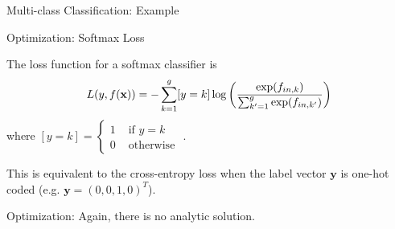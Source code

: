 \documentclass[11pt,compress,t,notes=noshow, xcolor=table]{beamer}
\begin{document}
\begin{frame} {Multi-class Classification: Example}
\begin{figure}
\end{figure}
\end{frame}

\begin{framei} {Optimization: Softmax Loss}
\vfill
\item The loss function for a softmax classifier is
$$L(y, f(\mathbf{x})) = - \sum_{k = 1}^g [y = k] \log \left( \frac{\exp(f_{in,k})}{\sum_{k'=1}^g\exp(f_{in,k'})}\right)$$
where $[y = k] = \begin{cases} 1 & \text{ if } y = k \\
0 & \text{ otherwise }
\end{cases}$. 
\vfill
\item This is equivalent to the cross-entropy loss when the label vector $\bm{y}$ is one-hot coded (e.g. $\mathbf{y} = (0,0,1,0)^T$). 
\item Optimization: Again, there is no analytic solution.
\end{framei}

\endlecture
\end{document}
